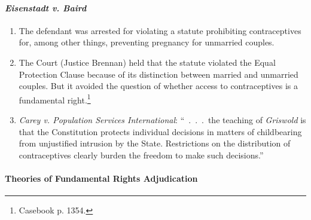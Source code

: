 \paragraph{\emph{Eisenstadt v. Baird}}
 
\begin{enumerate}
    \item The defendant was arrested for violating a statute prohibiting 
    contraceptives for, among other things, preventing pregnancy for unmarried 
    couples.
    \item The Court (Justice Brennan) held that the statute violated the Equal 
    Protection Clause because of its distinction between married and unmarried 
    couples. But it avoided the question of whether access to contraceptives 
    is a fundamental right.\footnote{Casebook p. 1354.}
    \item \emph{Carey v. Population Services International}: ``~.~.~.~the 
    teaching of \emph{Griswold} is that the Constitution protects individual 
    decisions in matters of childbearing from unjustified intrusion by the 
    State. Restrictions on the distribution of contraceptives clearly burden 
    the freedom to make such decisions.''
\end{enumerate}

\paragraph{Theories of Fundamental Rights Adjudication}

